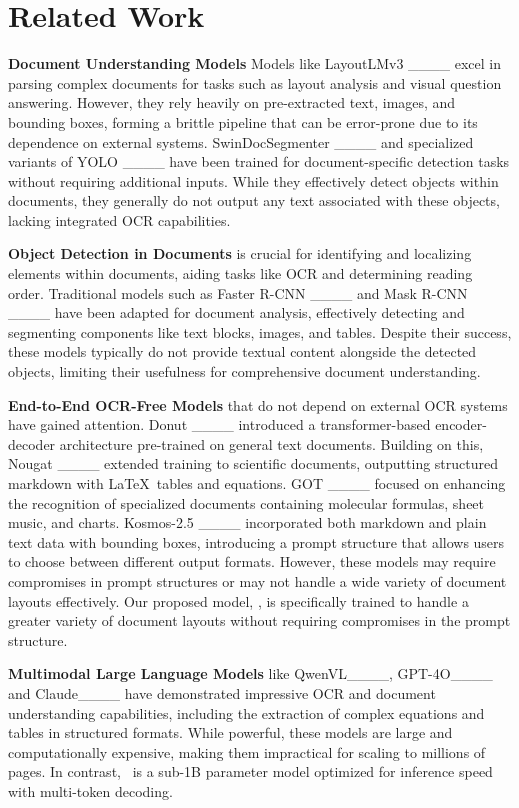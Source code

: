 \section{Related Work}
\textbf{Document Understanding Models} Models like LayoutLMv3 ____ excel in parsing complex documents for tasks such as layout analysis and visual question answering. However, they rely heavily on pre-extracted text, images, and bounding boxes, forming a brittle pipeline that can be error-prone due to its dependence on external systems. SwinDocSegmenter ____ and specialized variants of YOLO ____ have been trained for document-specific detection tasks without requiring additional inputs. While they effectively detect objects within documents, they generally do not output any text associated with these objects, lacking integrated OCR capabilities.

\textbf{Object Detection in Documents} is crucial for identifying and localizing elements within documents, aiding tasks like OCR and determining reading order. Traditional models such as Faster R-CNN ____ and Mask R-CNN ____ have been adapted for document analysis, effectively detecting and segmenting components like text blocks, images, and tables. Despite their success, these models typically do not provide textual content alongside the detected objects, limiting their usefulness for comprehensive document understanding.

\textbf{End-to-End OCR-Free Models} that do not depend on external OCR systems have gained attention. Donut ____ introduced a transformer-based encoder-decoder architecture pre-trained on general text documents. Building on this, Nougat ____ extended training to scientific documents, outputting structured markdown with \LaTeX\ tables and equations. GOT ____ focused on enhancing the recognition of specialized documents containing molecular formulas, sheet music, and charts. Kosmos-2.5 ____ incorporated both markdown and plain text data with bounding boxes, introducing a prompt structure that allows users to choose between different output formats. However, these models may require compromises in prompt structures or may not handle a wide variety of document layouts effectively. Our proposed model, \eclair, is specifically trained to handle a greater variety of document layouts without requiring compromises in the prompt structure.

\textbf{Multimodal Large Language Models} like QwenVL____, GPT-4O____ and Claude____ have demonstrated impressive OCR and document understanding capabilities, including the extraction of complex equations and tables in structured formats. While powerful, these models are large and computationally expensive, making them impractical for scaling to millions of pages. In contrast, \eclair\ is a sub-1B parameter model optimized for inference speed with multi-token decoding.
